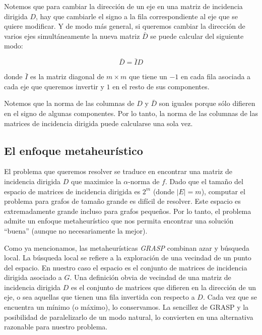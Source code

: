 \documentclass[conference,compsoc,a4paper]{IEEEtran}
\begin{document}
Notemos que para cambiar la dirección de un eje en una matriz de 
incidencia dirigida $D$, hay que cambiarle el signo a la fila correspondiente al 
eje que se quiere modificar. Y de modo más general, si queremos cambiar 
la dirección de varios ejes simultáneamente la nueva matriz $\bar{D}$
se puede calcular del siguiente modo:

$$\bar{D} = \bar{I} D$$

\smallskip

\noindent donde $\bar{I}$ es la matriz diagonal de $m \times m$ que tiene un $-1$ 
en cada fila asociada a cada eje que queremos invertir y $1$ en el resto 
de sus componentes.

\smallskip

Notemos que la norma de las columnas de $D$ y $\bar{D}$ son iguales 
porque sólo difieren en el signo de algunas componentes. Por lo tanto, 
la norma de las columnas de las matrices de incidencia dirigida puede 
calcularse una sola vez. 




\bigskip

\subsection{El enfoque metaheurístico}

El problema que queremos resolver se traduce en encontrar una matriz de 
incidencia dirigida $D$ que maximice la $\alpha$-norma de $f$. 
Dado que el tamaño del espacio de matrices de 
incidencia dirigida es $2^m$  (donde $|E|=m$), computar el problema
para grafos de tamaño grande es difícil de resolver. 
Este espacio es 
extremadamente grande incluso para grafos pequeños. Por lo tanto, el 
problema admite un enfoque metaheurístico que nos permita encontrar 
una solución ``buena'' (aunque no necesariamente la mejor).

\smallskip

Como ya mencionamos, las metaheurísticas \textit{GRASP} combinan azar y 
búsqueda local. La búsqueda local se refiere a la exploración de 
una vecindad de un punto del espacio. En nuestro caso el espacio es el 
conjunto de matrices de incidencia dirigida asociado a $G$. Una 
definición obvia de vecindad de una matriz de incidencia dirigida $D$ es 
el conjunto de matrices que difieren en la dirección de un eje, o sea 
aquellas que tienen una fila invertida con respecto a $D$. Cada vez que 
se encuentra un mínimo (o máximo), lo conservamos. La sencillez de 
GRASP y la posibilidad de paralelizarlo de un modo natural, lo 
convierten en una alternativa razonable para nuestro problema.
\end{document}
